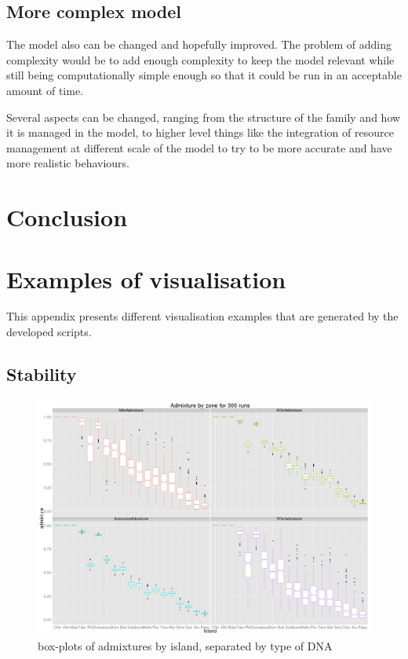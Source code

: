 \documentclass[a4paper,12pt]{report}
\begin{document}
\section{More complex model}
The model also can be changed and hopefully improved. The problem of adding complexity would be to add enough complexity to keep the model relevant while still being computationally simple enough so that it could be run in an acceptable amount of time.

Several aspects can be changed, ranging from the structure of the family and how it is managed in the model, to higher level things like the integration of resource management at different scale of the model to try to be more accurate and have more realistic behaviours.


\chapter*{Conclusion}




\appendix
\renewcommand{\thesection}{\Roman{section}}
\chapter{Examples of visualisation}
\label{app:ex-visu}

This appendix presents different visualisation examples that are generated by the developed scripts.

\section{Stability}
\begin{figure}[ht]
	\centering
	\includegraphics[scale=0.22]{../data/stability.png}
	\caption{box-plots of admixtures by island, separated by type of DNA}
	\label{app:stability}
\end{figure}
\end{document}
